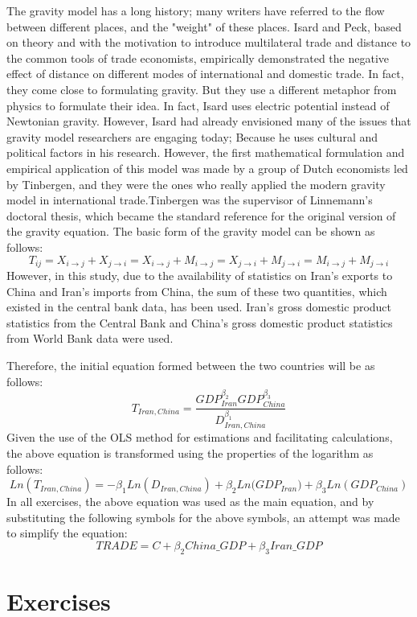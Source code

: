 \documentclass[12pt, letterpaper, twoside]{article}
\begin{document}
The gravity model has a long history; many writers have referred to the flow between different places, and the "weight" of these places. Isard and Peck\cite{Isard and Peck (1954)}, based on theory and with the motivation to introduce multilateral trade and distance to the common tools of trade economists, empirically demonstrated the negative effect of distance on different modes of international and domestic trade. In fact, they come close to formulating gravity. But they use a different metaphor from physics to formulate their idea. In fact, Isard uses electric potential instead of Newtonian gravity. However, Isard had already envisioned many of the issues that gravity model researchers are engaging today; Because he uses cultural and political factors in his research. However, the first mathematical formulation and empirical application of this model was made by a group of Dutch economists led by Tinbergen, and they were the ones who really applied the modern gravity model in international trade.\cite{Tinbergen(1963)}Tinbergen was the supervisor of Linnemann's doctoral thesis\cite{Linnemann (1967)}, which became the standard reference for the original version of the gravity equation. The basic form of the gravity model can be shown as follows:
\[T_{ij}=X_{i\to j}+X_{j \to i}=X_{i \to j}+M_{i \to j}= X_{j \to i}+M_{j \to i}=M_{ i \to j}+M_{j \to i}\]
However, in this study, due to the availability of statistics on Iran's exports to China and Iran's imports from China, the sum of these two quantities, which existed in the central bank data, has been used. Iran's gross domestic product statistics from the Central Bank and China's gross domestic product statistics from World Bank data were used.

Therefore, the initial equation formed between the two countries will be as follows:
\[T_{Iran,China}=\frac{GDP_{Iran}^{\beta_{2}}GDP_{China}^{\beta_{3}}}{D_{Iran,China}^{\beta_{1}}}\]
Given the use of the OLS method for estimations and facilitating calculations, the above equation is transformed using the properties of the logarithm as follows:
\[Ln(T_{Iran,China})=-\beta_{1}Ln(D_{Iran,China})+{\beta_{2} Ln(GDP_{Iran}})+\beta_{3}Ln(GDP_{China})\]
In all exercises, the above equation was used as the main equation, and by substituting the following symbols for the above symbols, an attempt was made to simplify the equation:
\[TRADE=C+\beta_{2}China{\_}GDP+\beta_{3}Iran{\_}GDP\]

\section{Exercises}
\end{document}
